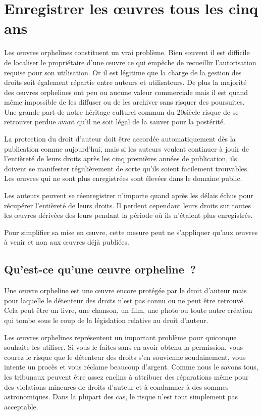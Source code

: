 \chapter{Enregistrer les œuvres tous les cinq ans}\label{registre}

Les œuvres orphelines constituent un vrai problème. Bien souvent il est difficile de localiser le
propriétaire d’une œuvre ce qui empêche de recueillir l'autorisation requise pour son utilisation. Or il est légitime que la charge de la gestion des droits soit également répartie entre auteurs et utilisateurs. De plus la
majorité des œuvres orphelines ont peu ou aucune valeur commerciale mais il est quand même
impossible de les diffuser ou de les archiver sans risquer des poursuites. Une grande part de notre héritage culturel commun du 20\ieme siècle risque de
se retrouver perdue avant qu’il ne soit légal de la sauver pour la postérité.

\begin{mesure}
La protection du droit d’auteur doit être accordée automatiquement dès la publication comme
aujourd’hui, mais si les auteurs veulent continuer à jouir de l'entièreté de leurs droits après les cinq
premières années de publication, ils doivent se manifester régulièrement de sorte qu’ils soient facilement
trouvables. Les œuvres qui ne sont plus enregistrées sont élevées dans le domaine public.

Les auteurs peuvent se réenregistrer n'importe quand après les délais échus pour récupérer l'entièreté de leurs droits. Il perdent cependant leurs droits sur toutes les œuvres dérivées des leurs pendant la période où ils n'étaient plus enregistrés. 

Pour simplifier sa mise en œuvre, cette mesure peut ne s'appliquer qu'aux œuvres à venir et non aux œuvres déjà publiées.
\end{mesure}

\section{Qu'est-ce qu'une œuvre orpheline~?}

Une œuvre orpheline est une œuvre encore protégée par le droit d’auteur mais pour laquelle le
détenteur des droits n’est pas connu ou ne peut être retrouvé. Cela peut être un livre, une chanson,
un film, une photo ou toute autre création qui tombe sous le coup de la législation relative au droit
d’auteur.

Les œuvres orphelines représentent un important problème pour quiconque souhaite les utiliser. Si
vous le faites sans en avoir obtenu la permission, vous courez le risque que le détenteur des droits
s’en souvienne soudainement, vous intente un procès et vous réclame beaucoup d’argent. Comme nous le
savons tous, les tribunaux peuvent être assez enclins à attribuer des réparations même pour des
violations mineures de droits d’auteur et à condamner à des sommes astronomiques. Dans la plupart
des cas, le risque n’est tout simplement pas acceptable.

